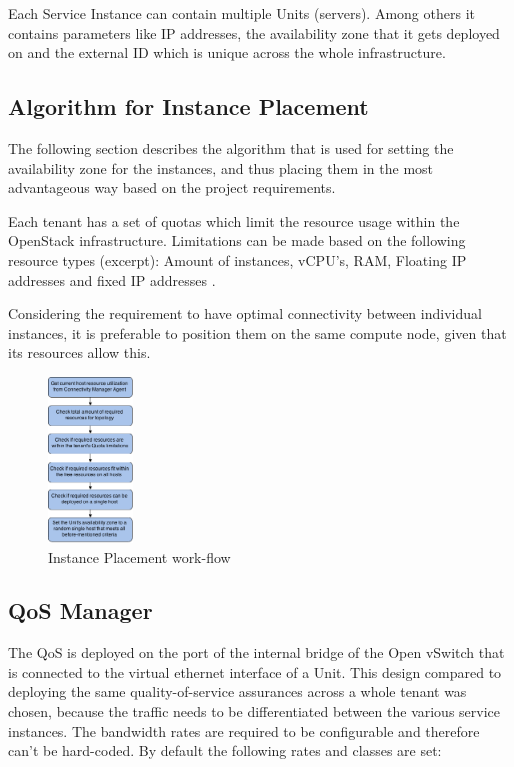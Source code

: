 Each Service Instance can contain multiple Units (servers). Among others it contains parameters like IP addresses, the availability zone that it gets deployed on and the external ID which is unique across the whole infrastructure.



\subsection{Algorithm for Instance Placement}

The following section describes the algorithm that is used for setting the availability zone for the instances, and thus placing them in the most advantageous way based on the project requirements.

Each tenant has a set of quotas which limit the resource usage within the OpenStack infrastructure. Limitations can be made based on the following resource types (excerpt): Amount of instances, vCPU's, RAM, Floating IP addresses and fixed IP addresses \cite{openstack-admin}.

Considering the requirement to have optimal connectivity between individual instances, it is preferable to position them on the same compute node, given that its resources allow this.

\begin{figure}[H]
\centering

\includegraphics[width=0.2\textwidth]{images/design/cm_instance_placement_engine.png}

\caption{Instance Placement work-flow}
\end{figure}


\subsection{QoS Manager}

The QoS is deployed on the port of the internal bridge of the Open vSwitch that is connected to the virtual ethernet interface of a Unit. This design compared to deploying the same quality-of-service assurances across a whole tenant was chosen, because the traffic needs to be differentiated between the various service instances. The bandwidth rates are required to be configurable and therefore can't be hard-coded. By default the following rates and classes are set:


